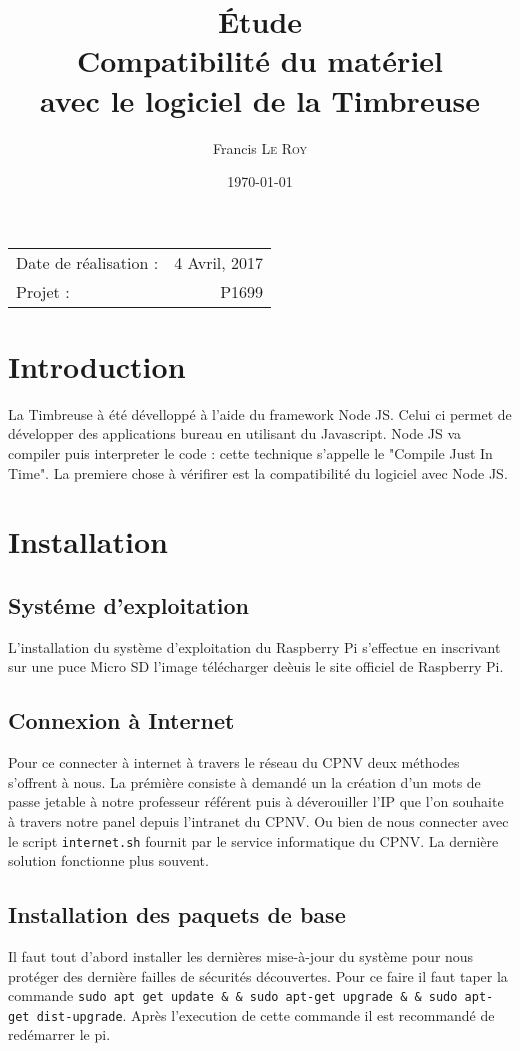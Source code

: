 \documentclass[10pt,a4paper,onecolumn]{article}
\title{Étude \\ Compatibilité du matériel \\ avec le logiciel de la Timbreuse}
\author{Francis \textsc{Le Roy}}
\date{\today}
\begin{document}
\maketitle
\thispagestyle{fancy}

\begin{center}
\begin{tabular}{l r}
Date de réalisation : & 4 Avril, 2017 \\
Projet : & P1699 \\
\end{tabular}
\end{center}


\section{Introduction}
La Timbreuse à été dévelloppé à l'aide du framework Node JS. Celui ci permet de développer des applications bureau en utilisant du Javascript.
Node JS va compiler puis interpreter le code : cette technique s'appelle le "Compile Just In Time". La premiere chose à vérifirer est la
compatibilité du logiciel avec Node JS.
\section{Installation}
\subsection{Systéme d'exploitation}
L'installation du système d'exploitation du Raspberry Pi s'effectue en inscrivant sur une puce Micro SD l'image télécharger deèuis le site officiel
de Raspberry Pi.
\subsection{Connexion à Internet}
Pour ce connecter à internet à travers le réseau du CPNV deux méthodes s'offrent à nous. La prémière consiste à demandé un la création d'un mots de passe
jetable à notre professeur référent puis à déverouiller l'IP que l'on souhaite à travers notre panel depuis l'intranet du CPNV. Ou bien de nous connecter
avec le script \texttt{internet.sh} fournit par le service informatique du CPNV. La dernière solution fonctionne plus souvent.

\subsection{Installation des paquets de base}
Il faut tout d'abord installer les dernières mise-à-jour du système pour nous protéger des dernière failles de sécurités découvertes.
Pour ce faire il faut taper la commande \texttt{sudo apt\- get update \& \&  sudo apt-get upgrade \& \&  sudo apt-get dist-upgrade}. Après l'execution de cette commande
il est recommandé de redémarrer le pi.
\end{document}
